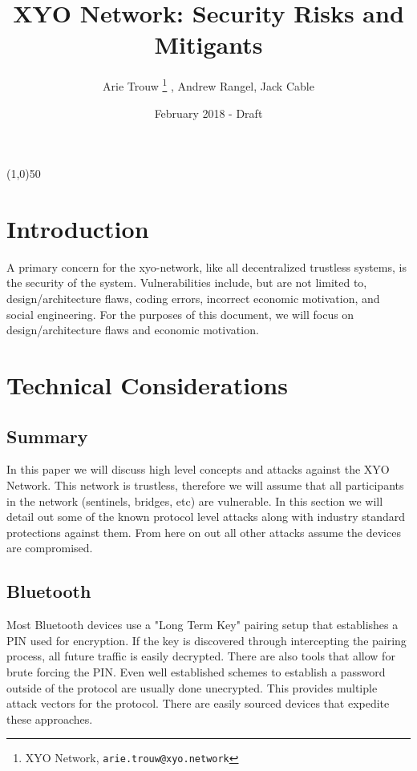 \documentclass{article}
\title {XYO Network: Security Risks and Mitigants}
\author{
    Arie Trouw \thanks{XYO Network, \texttt{arie.trouw@xyo.network}} , Andrew Rangel, Jack Cable
}
\date{February 2018 - Draft}
\begin{document}
\pagecolor{lightred}

\maketitle

\begin{center}
\line(1,0){50}
\end{center}

\section{Introduction}
A primary concern for the \gls{xyo-network}, like all decentralized trustless systems, is the security of the system.  Vulnerabilities include, but are not limited to, design/architecture flaws, coding errors, incorrect economic motivation, and social engineering. For the purposes of this document, we will focus on design/architecture flaws and economic motivation.

\section {Technical Considerations}
\subsection{Summary}
In this paper we will discuss high level concepts and attacks against the XYO Network. This network is \gls{trustless}, therefore we will assume that all participants in the network (sentinels, bridges, etc) are vulnerable. In this section we will detail out some of the known protocol level attacks along with industry standard protections against them. From here on out all other attacks assume the devices are compromised.

\subsection{Bluetooth}
Most Bluetooth devices use a "Long Term Key" pairing setup that establishes a PIN used for encryption. If the key is discovered through intercepting the pairing process, all future traffic is easily decrypted. There are also tools that allow for brute forcing the PIN. Even well established schemes to establish a password outside of the protocol are usually done unecrypted. This provides multiple attack vectors for the protocol. There are easily sourced devices that expedite these approaches.
\end{document}
